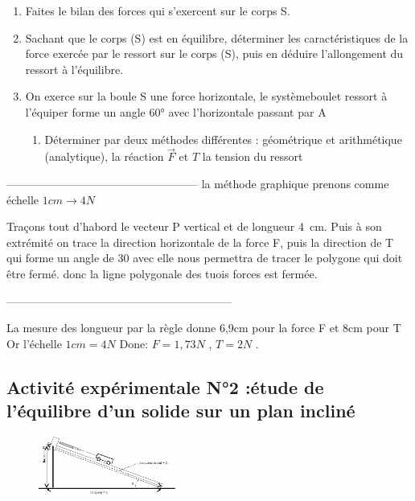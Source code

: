 \documentclass[12pt]{article}
\begin{document}
\begin{enumerate}
	\item Faites le bilan des forces qui s'exercent sur le corps S.
	\item Sachant que le corps (S) est en équilibre, déterminer les caractéristiques de la force exercée par le ressort sur le corps (S), puis en déduire l'allongement du ressort à l'équilibre.

			\item On exerce sur la boule S une force horizontale, le système{boulet ressort} à l'équiper forme un angle 60° avec l'horizontale passant par A
		\begin{enumerate}
			\item Déterminer par deux méthodes différentes : géométrique et
arithmétique (analytique), la réaction $\vec{F}$ et $T$ la tension du ressort
		\end{enumerate}
\end{enumerate}

---------------------------------------------------
la méthode graphique prenons comme échelle $1cm \rightarrow 4N$

Traçons tout d'habord le vecteur P vertical et de longueur 4 cm. Puis à son extrémité on trace la
direction horizontale de la force F, puis la direction de T qui forme un angle de 30 avec elle
nous permettra de tracer le polygone qui doit être fermé.
donc la ligne polygonale des tuois forces est fermée.

------------------------------------------------------------

La mesure des longueur par la règle donne 6,9cm pour la force F et 8cm pour T  Or l'échelle $1cm=4N$ Done: $F=  1,73N$ , $T= 2N$ .

\subsection{Activité expérimentale N°2 :étude de l’équilibre d’un solide sur un plan incliné  }
 
\begin{figure}
\includegraphics[width=0.4\textwidth]{./img/img03.png}
\end{figure}
\end{document}
